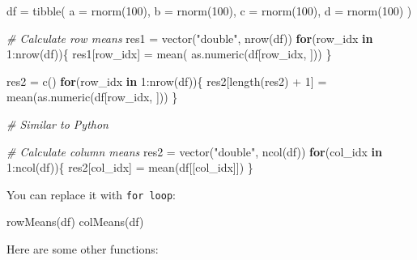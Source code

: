 \documentclass[
]{article}
\newenvironment{Shaded}{}{}
\newcommand{\AttributeTok}[1]{\textcolor[rgb]{0.49,0.56,0.16}{#1}}
\newcommand{\CommentTok}[1]{\textcolor[rgb]{0.38,0.63,0.69}{\textit{#1}}}
\newcommand{\ControlFlowTok}[1]{\textcolor[rgb]{0.00,0.44,0.13}{\textbf{#1}}}
\newcommand{\DecValTok}[1]{\textcolor[rgb]{0.25,0.63,0.44}{#1}}
\newcommand{\FunctionTok}[1]{\textcolor[rgb]{0.02,0.16,0.49}{#1}}
\newcommand{\NormalTok}[1]{#1}
\newcommand{\OtherTok}[1]{\textcolor[rgb]{0.00,0.44,0.13}{#1}}
\newcommand{\SpecialCharTok}[1]{\textcolor[rgb]{0.25,0.44,0.63}{#1}}
\newcommand{\StringTok}[1]{\textcolor[rgb]{0.25,0.44,0.63}{#1}}
\begin{document}
\begin{Shaded}
\begin{Highlighting}[]
\NormalTok{df }\OtherTok{=}
	\FunctionTok{tibble}\NormalTok{( }
    \AttributeTok{a =} \FunctionTok{rnorm}\NormalTok{(}\DecValTok{100}\NormalTok{), }
    \AttributeTok{b =} \FunctionTok{rnorm}\NormalTok{(}\DecValTok{100}\NormalTok{), }
    \AttributeTok{c =} \FunctionTok{rnorm}\NormalTok{(}\DecValTok{100}\NormalTok{), }
    \AttributeTok{d =} \FunctionTok{rnorm}\NormalTok{(}\DecValTok{100}\NormalTok{)}
\NormalTok{  )}

\CommentTok{\# Calculate row means }
\NormalTok{res1 }\OtherTok{=}
	\FunctionTok{vector}\NormalTok{(}\StringTok{"double"}\NormalTok{, }\FunctionTok{nrow}\NormalTok{(df))}
\ControlFlowTok{for}\NormalTok{(row\_idx }\ControlFlowTok{in} \DecValTok{1}\SpecialCharTok{:}\FunctionTok{nrow}\NormalTok{(df))\{}
\NormalTok{  res1[row\_idx] }\OtherTok{=}
  	\FunctionTok{mean}\NormalTok{( }\FunctionTok{as.numeric}\NormalTok{(df[row\_idx, ]))}
\NormalTok{\}}

\NormalTok{res2 }\OtherTok{=} \FunctionTok{c}\NormalTok{()}
\ControlFlowTok{for}\NormalTok{(row\_idx }\ControlFlowTok{in} \DecValTok{1}\SpecialCharTok{:}\FunctionTok{nrow}\NormalTok{(df))\{}
\NormalTok{  res2[}\FunctionTok{length}\NormalTok{(res2) }\SpecialCharTok{+} \DecValTok{1}\NormalTok{] }\OtherTok{=}
  	\FunctionTok{mean}\NormalTok{(}\FunctionTok{as.numeric}\NormalTok{(df[row\_idx, ]))}
\NormalTok{\}}

\CommentTok{\# Similar to Python}

\CommentTok{\# Calculate column means }
\NormalTok{res2 }\OtherTok{=}
	\FunctionTok{vector}\NormalTok{(}\StringTok{"double"}\NormalTok{, }\FunctionTok{ncol}\NormalTok{(df))}
\ControlFlowTok{for}\NormalTok{(col\_idx }\ControlFlowTok{in} \DecValTok{1}\SpecialCharTok{:}\FunctionTok{ncol}\NormalTok{(df))\{}
\NormalTok{  res2[col\_idx] }\OtherTok{=}
  	\FunctionTok{mean}\NormalTok{(df[[col\_idx]])}
\NormalTok{\}}
\end{Highlighting}
\end{Shaded}

You can replace it with \texttt{for\ loop}:

\begin{Shaded}
\begin{Highlighting}[]
\FunctionTok{rowMeans}\NormalTok{(df)}
\FunctionTok{colMeans}\NormalTok{(df)}
\end{Highlighting}
\end{Shaded}

Here are some other functions:
\end{document}
